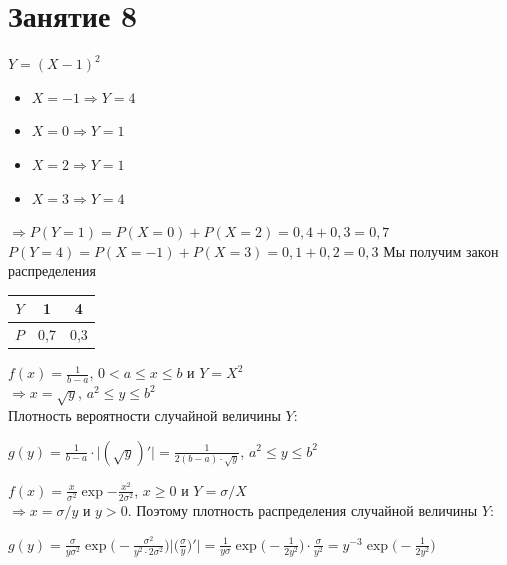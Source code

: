 \section*{Занятие 8}
\begin{exercise}[1]
	$Y=(X-1)^2$
	\begin{itemize}
		\item $X=-1 \Rightarrow Y=4$
		\item $X=0 \Rightarrow Y=1$
		\item $X=2 \Rightarrow Y=1$
		\item $X=3 \Rightarrow Y=4$
	\end{itemize}
	$\Rightarrow P(Y=1) = P(X=0)+P(X=2)=0,4+0,3=0,7$ \\ $P(Y=4) = P(X=-1) + P(X=3)=0,1+0,2=0,3$
	Мы получим закон распределения
	\begin{center}
		\begin{tabular}{|c|c|c|}
			\hline
			$Y$ & 1 & 4 \\ \hline
			$P$ & 0,7 & 0,3 \\ \hline
		\end{tabular}
	\end{center}
\end{exercise}

\begin{exercise}[2]
	$f(x) = \frac{1}{b-a}$, $0 < a \leq x \leq b$ и $Y=X^2$ \\ $\Rightarrow x=\sqrt{y}$, $a^2 \leq y \leq b^2$ \\ Плотность вероятности случайной величины $Y$:
	
	$g(y) = \frac{1}{b-a} \cdot \Big|(\sqrt{y})'\Big| = \frac{1}{2(b-a)\cdot \sqrt{y}}$, $a^2 \leq y \leq b^2$
\end{exercise}

\begin{exercise}[3]
	$f(x) = \frac{x}{\sigma^2} \exp{-\frac{x^2}{2\sigma^2}}$, $x \geq 0$ и $Y=\sigma/X$ \\ $\Rightarrow x=\sigma/y$ и $y > 0$. Поэтому плотность распределения случайной величины $Y$:
	
	$g(y) = \frac{\sigma}{y\sigma^2} \exp\Big(-\frac{\sigma^2}{y^2 \cdot 2 \sigma^2}\Big) \Big|\Big(\frac{\sigma}{y}\Big)'\Big| = \frac{1}{y \sigma} \exp\Big(-\frac{1}{2y^2}\Big) \cdot \frac{\sigma}{y^2} = y^{-3} \exp\Big(-\frac{1}{2y^2}\Big)$
\end{exercise}

